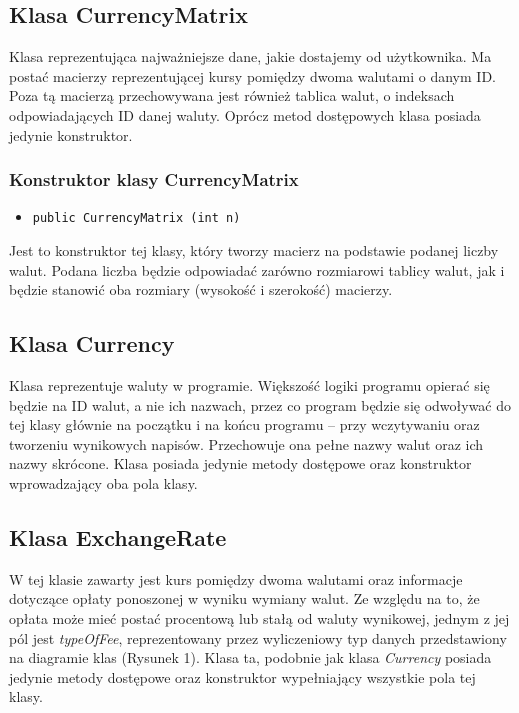 \documentclass[a4paper,11pt]{article}
\newcommand\tab[1][0.6cm]{\hspace*{#1}}
\begin{document}
\subsection{Klasa CurrencyMatrix}
\tab Klasa reprezentująca najważniejsze dane, jakie dostajemy od użytkownika. Ma postać macierzy reprezentującej kursy pomiędzy dwoma walutami o danym ID. Poza tą macierzą przechowywana jest również tablica walut, o indeksach odpowiadających ID danej waluty. Oprócz metod dostępowych klasa posiada jedynie konstruktor.

\subsubsection{Konstruktor klasy CurrencyMatrix}
\begin{itemize}
\item \begin{lstlisting}
public CurrencyMatrix (int n)
\end{lstlisting}
\end{itemize}

\tab Jest to konstruktor tej klasy, który tworzy macierz na podstawie podanej liczby walut. Podana liczba będzie odpowiadać zarówno rozmiarowi tablicy walut, jak i będzie stanowić oba rozmiary (wysokość i szerokość) macierzy.

\subsection{Klasa Currency}

\tab Klasa reprezentuje waluty w programie. Większość logiki programu opierać się będzie na ID walut, a nie ich nazwach, przez co program będzie się odwoływać do tej klasy głównie na początku i na końcu programu -- przy wczytywaniu oraz tworzeniu wynikowych napisów. Przechowuje ona pełne nazwy walut oraz ich nazwy skrócone. Klasa posiada jedynie metody dostępowe oraz konstruktor wprowadzający oba pola klasy.


\subsection{Klasa ExchangeRate}

\tab W tej klasie zawarty jest kurs pomiędzy dwoma walutami oraz informacje dotyczące opłaty ponoszonej w wyniku wymiany walut. Ze względu na to, że opłata może mieć postać procentową lub stałą od waluty wynikowej, jednym z jej pól jest \textit{typeOfFee}, reprezentowany przez wyliczeniowy typ danych przedstawiony na diagramie klas (Rysunek 1). Klasa ta, podobnie jak klasa \textit{Currency} posiada jedynie metody dostępowe oraz konstruktor wypełniający wszystkie pola tej klasy.
\end{document}
